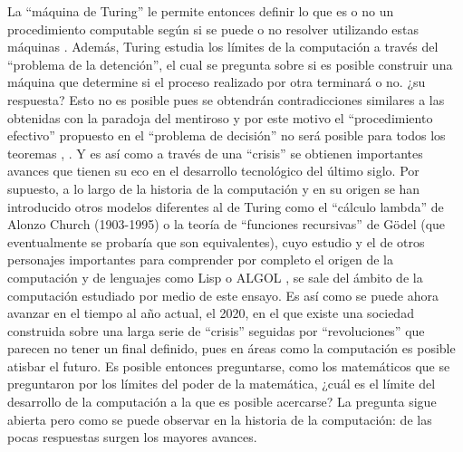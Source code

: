 \documentclass[a4paper,11pt]{article}
\begin{document}
La “máquina de Turing” le permite entonces definir lo que es o no un procedimiento computable según si se puede o no resolver utilizando estas máquinas \cite{hernández_2013}. Además, Turing estudia los límites de la computación a través del “problema de la detención”, el cual se pregunta sobre si es posible construir una máquina que determine si el proceso realizado por otra terminará o no. ¿su respuesta? Esto no es posible pues se obtendrán contradicciones similares a las obtenidas con la paradoja del mentiroso y por este motivo el “procedimiento efectivo” propuesto en el “problema de decisión” no será posible para todos los teoremas \cite{chaitin2003ordenadores}, \cite{hernández_2013}.
Y es así como a través de una “crisis” se obtienen importantes avances que tienen su eco en el desarrollo tecnológico del último siglo. Por supuesto, a lo largo de la historia de la computación y en su origen se han introducido otros modelos diferentes al de Turing como el “cálculo lambda” de Alonzo Church (1903-1995) o la teoría de “funciones recursivas” de Gödel (que eventualmente se probaría que son equivalentes), cuyo estudio y el de otros personajes importantes para comprender por completo el origen de la computación y de lenguajes como Lisp o ALGOL \cite{hernández_2013}, \cite{baez2010physics} se sale del ámbito de la computación estudiado por medio de este ensayo.
Es así como se puede ahora avanzar en el tiempo al año actual, el 2020, en el que existe una sociedad construida sobre una larga serie de “crisis” seguidas por “revoluciones” que parecen no tener un final definido, pues en áreas como la computación es posible atisbar el futuro. Es posible entonces preguntarse, como los matemáticos que se preguntaron por los límites del poder de la matemática, ¿cuál es el límite del desarrollo de la computación a la que es posible acercarse? La pregunta sigue abierta pero como se puede observar en la historia de la computación: de las pocas respuestas surgen los mayores avances.  

\nocite{maestre_timón_2018}



\newpage

\renewcommand\refname{REFERENCIAS BIBLIOGRÁFICAS}
%


\end{document}
